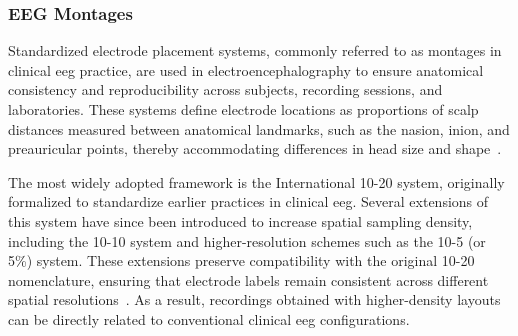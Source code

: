 
\subsubsection{EEG Montages}

Standardized electrode placement systems, commonly referred to as montages in clinical \gls{eeg} practice, are used in electroencephalography to ensure anatomical consistency and reproducibility across subjects,
recording sessions, and laboratories. These systems define electrode locations as proportions of scalp distances measured between anatomical landmarks,
such as the nasion, inion, and preauricular points, thereby accommodating differences in head size and shape~\cite{klem-1999}.

The most widely adopted framework is the International 10{-}20 system, originally formalized to standardize earlier practices in clinical \gls{eeg}.
Several extensions of this system have since been introduced to increase spatial sampling density, including the 10{-}10 system and higher-resolution
schemes such as the 10{-}5 (or 5\%) system. These extensions preserve compatibility with the original 10{-}20 nomenclature, ensuring that electrode labels
remain consistent across different spatial resolutions~\cite{klem-1999}. As a result, recordings obtained with higher-density layouts can be directly related to
conventional clinical \gls{eeg} configurations.

